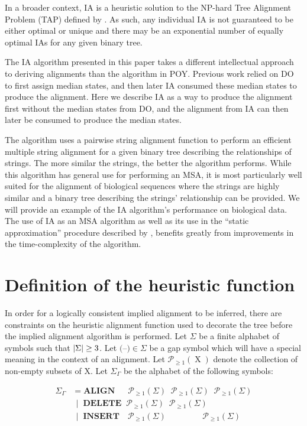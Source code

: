 \documentclass[11pt]{article}
\newcommand*\NEPowerset{\mathcal{P}_{\geq 1}}
\newcommand*\gap{\textrm{(--)}}
\DeclarePairedDelimiter\setsize{\lvert}{\rvert}%
\begin{document}
In a broader context, IA is a heuristic solution to the NP-hard Tree Alignment Problem (TAP) defined by \cite{sankoff1975}.
As such, any individual IA is not guaranteed to be either optimal or unique and there may be an exponential number of equally optimal IAs for any given binary tree.

The IA algorithm presented in this paper takes a different intellectual approach to deriving alignments than the algorithm in POY.
Previous work relied on DO to first assign median states, and then later IA consumed these median states to produce the alignment.
Here we describe IA as a way to produce the alignment first without the median states from DO, and the alignment from IA can then later be consumed to produce the median states.

The algorithm uses a pairwise string alignment function to perform an efficient multiple string alignment for a given binary tree describing the relationships of strings.
The more similar the strings, the better the algorithm performs.
While this algorithm has general use for performing an MSA, it is most particularly well suited for the alignment of biological sequences where the strings are highly similar and a binary tree describing the strings' relationship can be provided. 
We will provide an example of the IA algorithm's performance on biological data.
The use of IA as an MSA algorithm as well as its use in the ``static approximation'' procedure described by \cite{Wheeler2003b}, benefits greatly from improvements in the time-complexity of the algorithm.

\section{Definition of the heuristic function}
In order for a logically consistent implied alignment to be inferred, there are constraints on the heuristic alignment function used to decorate the tree before the implied alignment algorithm is performed.
Let $\Sigma$ be a finite alphabet of symbols such that $\setsize{\Sigma} \geq 3$.
Let $\gap \in \Sigma$ be a gap symbol which will have a special meaning in the context of an alignment.
Let $\NEPowerset (\operatorname{X})$ denote the collection of non-empty subsets of $\mathrm{X}$.
Let $\Sigma_{\Gamma}$ be the alphabet of the following symbols:

\begin{align*}
  \Sigma_{\Gamma} &      = \textbf{ALIGN}  \;\;\;\;\;\,  \NEPowerset (\Sigma) \;\; \NEPowerset (\Sigma) \;\; \NEPowerset (\Sigma)
\\                & \;\, | \;\; \textbf{DELETE} \;\;     \NEPowerset (\Sigma) \;\; \NEPowerset (\Sigma)
\\                & \;\, | \;\; \textbf{INSERT} \;\;\;\, \NEPowerset (\Sigma) \;\; \quad\quad\quad\;         \;\; \NEPowerset (\Sigma)
\end{align*}
\end{document}
